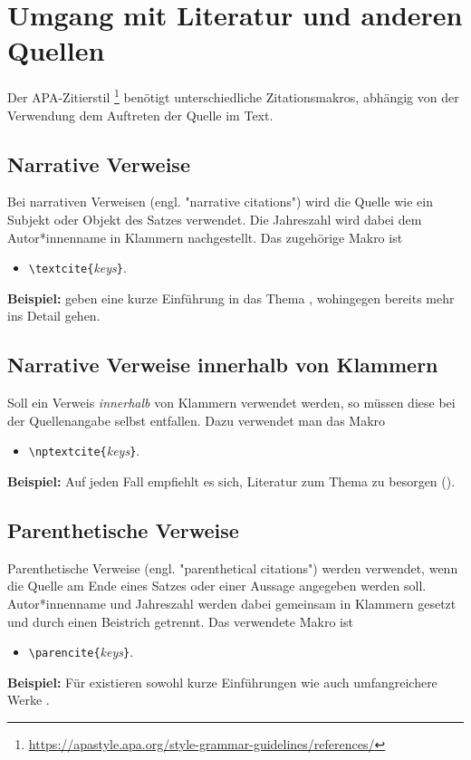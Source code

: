 \chapter[Umgang mit Literatur]{Umgang mit Literatur und anderen Quellen}
\label{cha:Literatur}

Der APA-Zitierstil%
\footnote{\url{https://apastyle.apa.org/style-grammar-guidelines/references/}}
benötigt unterschiedliche Zitationsmakros, abhängig von der Verwendung \bzw dem Auftreten der Quelle im Text.

\section{Narrative Verweise}

Bei narrativen Verweisen (engl. "narrative citations") wird die Quelle wie ein Subjekt oder Objekt des Satzes
verwendet. Die Jahreszahl wird dabei dem Autor*innenname in Klammern nachgestellt. Das zugehörige Makro ist
%
\begin{itemize}
\item[] \verb!\textcite{!\textit{keys}\verb!}!.
\end{itemize}
%
\textbf{Beispiel:}
\textcite{Daniel2018} geben eine kurze Einführung in das Thema \latex, wohingegen \textcite{Oetiker2021, Kopka2003}
bereits mehr ins Detail gehen.


\section{Narrative Verweise innerhalb von Klammern}

Soll ein Verweis \emph{innerhalb} von Klammern verwendet werden, so müssen diese bei der Quellenangabe
selbst entfallen. Dazu verwendet man das Makro 
%
\begin{itemize}
\item[] \verb!\nptextcite{!\textit{keys}\verb!}!.
\end{itemize}
%
\textbf{Beispiel:}
Auf jeden Fall empfiehlt es sich, Literatur zum Thema \latex zu besorgen (\zB {}).

\section{Parenthetische Verweise}

Parenthetische Verweise (engl. "parenthetical citations") werden verwendet, wenn die Quelle am
Ende eines Satzes oder einer Aussage angegeben werden soll. Autor*innen\-name und Jahreszahl
werden dabei gemeinsam in Klammern gesetzt und durch einen Beistrich getrennt.
Das verwendete Makro ist
%
\begin{itemize}
\item[] \verb!\parencite{!\textit{keys}\verb!}!.
\end{itemize}
%
\textbf{Beispiel:}
Für \latex existieren sowohl kurze Einführungen \parencite{Daniel2018} wie auch umfangreichere Werke 
\parencite{Oetiker2021, Kopka2003}.

